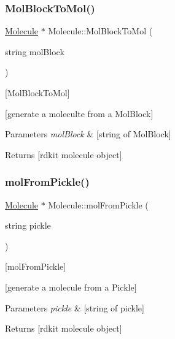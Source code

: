 \subsubsection{\texorpdfstring{Mol\+Block\+To\+Mol()}{MolBlockToMol()}}
{\footnotesize\ttfamily \mbox{\hyperlink{class_molecule}{Molecule}} $\ast$ Molecule\+::\+Mol\+Block\+To\+Mol (\begin{DoxyParamCaption}\item[{string}]{mol\+Block }\end{DoxyParamCaption})\hspace{0.3cm}{\ttfamily [static]}}



\mbox{[}Mol\+Block\+To\+Mol\mbox{]} 

\mbox{[}generate a moleculte from a Mol\+Block\mbox{]}


\begin{DoxyParams}{Parameters}
{\em mol\+Block} & \mbox{[}string of Mol\+Block\mbox{]} \\
\hline
\end{DoxyParams}
\begin{DoxyReturn}{Returns}
\mbox{[}rdkit molecule object\mbox{]} 
\end{DoxyReturn}
\mbox{\label{class_molecule_a2425937fefa34d28560ef4ad152b9602}} 
\subsubsection{\texorpdfstring{mol\+From\+Pickle()}{molFromPickle()}}
{\footnotesize\ttfamily \mbox{\hyperlink{class_molecule}{Molecule}} $\ast$ Molecule\+::mol\+From\+Pickle (\begin{DoxyParamCaption}\item[{string}]{pickle }\end{DoxyParamCaption})\hspace{0.3cm}{\ttfamily [static]}}



\mbox{[}mol\+From\+Pickle\mbox{]} 

\mbox{[}generate a molecule from a Pickle\mbox{]}


\begin{DoxyParams}{Parameters}
{\em pickle} & \mbox{[}string of pickle\mbox{]} \\
\hline
\end{DoxyParams}
\begin{DoxyReturn}{Returns}
\mbox{[}rdkit molecule object\mbox{]} 
\end{DoxyReturn}
\mbox{\label{class_molecule_a49bb8305f51929c61864c2f2d7099c3f}} 
